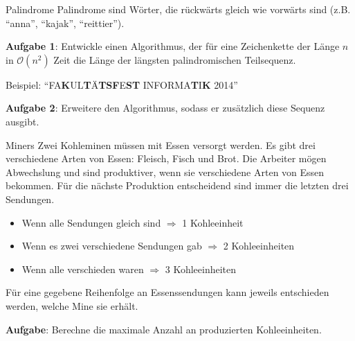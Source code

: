 \begin{frame}{Palindrome}
	Palindrome sind Wörter, die rückwärts gleich wie vorwärts sind (z.B. "`anna"', "`kajak"', "`reittier"').

	\textbf{Aufgabe 1}: Entwickle einen Algorithmus, der für eine Zeichenkette der Länge $n$ in $\mathcal{O}(n^2)$ Zeit die Länge der längsten palindromischen Teilsequenz.

	Beispiel: "`FA\textbf{K}UL\textbf{T}Ä\textbf{TSF}E\textbf{ST} INFORMA\textbf{T}I\textbf{K} 2014"'

	\textbf{Aufgabe 2}: Erweitere den Algorithmus, sodass er zusätzlich diese Sequenz ausgibt.
\end{frame}

\begin{frame}{Miners}
	Zwei Kohleminen müssen mit Essen versorgt werden.
	Es gibt drei verschiedene Arten von Essen: Fleisch, Fisch und Brot.
	Die Arbeiter mögen Abwechslung und sind produktiver, wenn sie verschiedene Arten von Essen bekommen.
	Für die nächste Produktion entscheidend sind immer die letzten drei Sendungen.

	\begin{itemize}
		\item Wenn alle Sendungen gleich sind $\Rightarrow$ 1 Kohleeinheit
		\item Wenn es zwei verschiedene Sendungen gab $\Rightarrow$ 2 Kohleeinheiten
		\item Wenn alle verschieden waren $\Rightarrow$ 3 Kohleeinheiten
	\end{itemize}

	Für eine gegebene Reihenfolge an Essenssendungen kann jeweils entschieden werden, welche Mine sie erhält.

	\textbf{Aufgabe}: Berechne die maximale Anzahl an produzierten Kohleeinheiten.
\end{frame}


